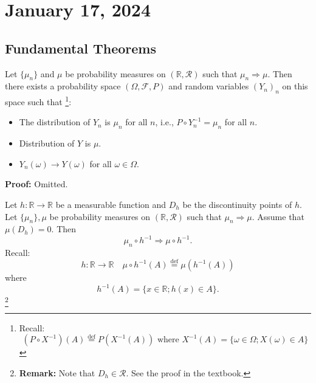 \newpage
\section{January 17, 2024}
\subsection{Fundamental Theorems}
\begin{theorem}
Let \( \{\mu_n\} \) and \( \mu \) be probability measures on \( (\mathbb{R}, \mathcal{R}) \) such that \( \mu_n \Rightarrow \mu \). Then there exists a probability space \( (\Omega, \mathcal{F}, P) \) and random variables \( (Y_n)_n \) on this space such that
\footnote{Recall:
\[ (P \circ X^{-1})(A) \stackrel{\text{def}}{=} P(X^{-1}(A)) \text{ where } X^{-1}(A) = \{\omega \in \Omega; X(\omega) \in A\} \]}:
\begin{itemize}
    \item The distribution of \( Y_n \) is \( \mu_n \) for all \( n \), i.e., \( P \circ Y_n^{-1} = \mu_n \) for all \( n \).
    \item Distribution of \( Y \) is \( \mu \).
    \item \( Y_n(\omega) \rightarrow Y(\omega) \) for all \( \omega \in \Omega \).
\end{itemize}

\end{theorem}
\textbf{Proof:} Omitted.


\begin{theorem}
Let \( h: \mathbb{R} \to \mathbb{R} \) be a measurable function and \( D_h \) be the discontinuity points of \( h \). Let \( \{\mu_n\}, \mu \) be probability measures on \( (\mathbb{R}, \mathcal{R}) \) such that \( \mu_n \Rightarrow \mu \). Assume that \( \mu(D_h) = 0 \). Then 
\[ \mu_n \circ h^{-1} \Rightarrow \mu \circ h^{-1}. \]
Recall:
\[ h: \mathbb{R} \to \mathbb{R} \quad \mu \circ h^{-1}(A) \stackrel{\text{def}}{=} \mu(h^{-1}(A)) \]
where 
\[ h^{-1}(A) = \{ x \in \mathbb{R}; h(x) \in A \}. \]\footnote{
\textbf{Remark:} Note that \( D_h \in \mathcal{R} \). See the proof in the textbook.}
\end{theorem}

